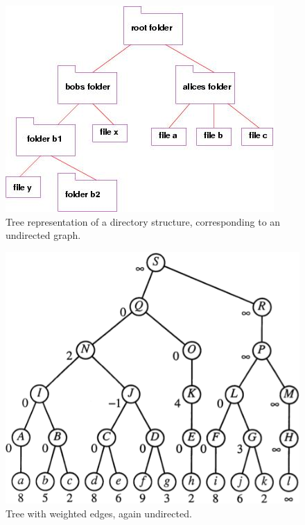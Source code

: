 \documentclass[a4paper,10pt]{report}
\begin{document}
\begin{figure}[H]
	\begin{centering}
	\begin{center}
	\includegraphics[width=\textwidth]{./tree.png}
	\caption{Tree representation of a directory structure, corresponding to an undirected graph.}
	\label{fig:directory}
	\end{center}
	\par\end{centering}
\end{figure}

\begin{figure}[H]
	\begin{centering}
	\begin{center}
	\includegraphics[width=\linewidth]{./topology-tree.png}
	\caption{Tree with weighted edges, again undirected.}
	\label{fig:??????}
	\end{center}
	\par\end{centering}
\end{figure}
\end{document}
